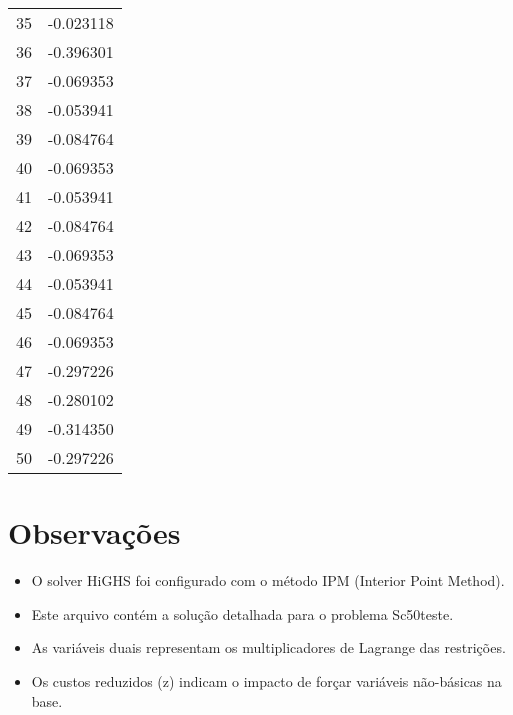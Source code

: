 \documentclass[12pt]{article}
\begin{document}
\begin{longtable}{@{}cc@{}}
35 & -0.023118 \\
36 & -0.396301 \\
37 & -0.069353 \\
38 & -0.053941 \\
39 & -0.084764 \\
40 & -0.069353 \\
41 & -0.053941 \\
42 & -0.084764 \\
43 & -0.069353 \\
44 & -0.053941 \\
45 & -0.084764 \\
46 & -0.069353 \\
47 & -0.297226 \\
48 & -0.280102 \\
49 & -0.314350 \\
50 & -0.297226 \\

\end{longtable}


\section{Observações}

\begin{itemize}
\item O solver HiGHS foi configurado com o método IPM (Interior Point Method).
\item Este arquivo contém a solução detalhada para o problema Sc50teste.
\item As variáveis duais representam os multiplicadores de Lagrange das restrições.
\item Os custos reduzidos (z) indicam o impacto de forçar variáveis não-básicas na base.
\end{itemize}
\end{document}
